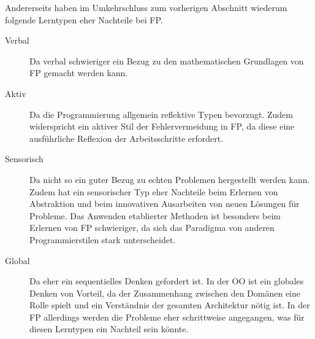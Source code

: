 Andererseits haben im Umkehrschluss zum vorherigen Abschnitt wiederum folgende Lerntypen eher Nachteile bei FP.

\begin{description}
    \item[Verbal] Da verbal schwieriger ein Bezug zu den mathematischen Grundlagen von FP gemacht werden kann.
    \item[Aktiv] Da die Programmierung allgemein reflektive Typen bevorzugt. Zudem widerspricht ein aktiver Stil der Fehlervermeidung in FP, da diese eine ausführliche Reflexion der Arbeitsschritte erfordert.
    \item[Sensorisch] Da nicht so ein guter Bezug zu echten Problemen hergestellt werden kann. Zudem hat ein sensorischer Typ eher Nachteile beim Erlernen von Abstraktion und beim innovativen Ausarbeiten von neuen Lösungen für Probleme. Das Anwenden etablierter Methoden ist besonders beim Erlernen von FP schwieriger, da sich das Paradigma von anderen Programmierstilen stark unterscheidet.
    \item[Global] Da eher ein sequentielles Denken gefordert ist. In der OO ist ein globales Denken von Vorteil, da der Zusammenhang zwischen den Domänen eine Rolle spielt und ein Verständnis der gesamten Architektur nötig ist. In der FP allerdings werden die Probleme eher schrittweise angegangen, was für diesen Lerntypen ein Nachteil sein könnte.
\end{description}